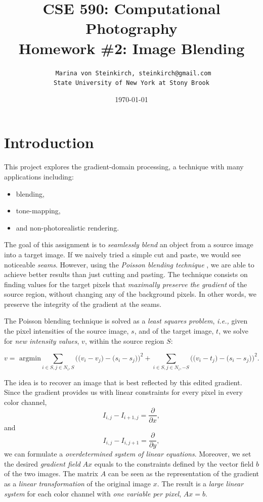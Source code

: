 \documentclass[11pt]{article}
\title{CSE 590: Computational Photography\\  Homework \#2: Image Blending }
\author{ \texttt{ Marina von Steinkirch, steinkirch@gmail.com}\\
	   \texttt{State University of New York at Stony Brook}}
\date{\today}
\newcommand{\ie}{{\it i.e., }}
\begin{document}
\maketitle
{}  




\section{Introduction}

This project explores the gradient-domain processing, a technique with many applications including:
\begin{itemize}
\item blending, 
\item tone-mapping, 
\item and non-photorealistic rendering.
\end{itemize}  

\quad

The  goal of this assignment is to {\it seamlessly blend} an object  from a source image into a target image. If we naively tried a simple cut and paste, we would see noticeable {\it seams}.  However, using the {\it Poisson blending technique} \cite{pois}, we are able  to achieve better results than just cutting and pasting.  The technique consists on finding values for the target pixels that {\it maximally preserve the gradient} of the source region, without changing any of the background pixels. In other words, we preserve the integrity of the gradient at the seams.

\quad 

The Poisson blending technique is solved as a {\it least squares problem}, \ie given the pixel intensities of the source image, $s$, and of the target image, $t$, we  solve for {\it new intensity values},  $v$, within the source region $S$:

\begin{equation}
v = \mbox{ argmin} \sum_{i \in S, j \in N_i, S} \Bigg ( \Big ( v_i -v_j\Big) - \Big (s_i - s_j \Big) \Bigg)^2 +  \sum_{i \in S, j \in N_i, -S} \Bigg ( \Big ( v_i -t_j\Big) - \Big (s_i - s_j \Big) \Bigg)^2. 
\label{aa}
\end{equation}

\quad

The idea is to recover an image that is best reflected by this edited gradient. Since the gradient provides us with linear constraints for every pixel in every color channel,
$$I_{i,j} - I_{i+1,j} = \frac{\partial}{\partial x},$$
and
$$I_{i,j} - I_{i,j+1} = \frac{\partial}{\partial y},$$
 we can formulate a {\it overdetermined system of linear equations}. Moreover, we set the desired {\it gradient field} $A x$ equals to the constraints defined by the vector field $b$ of the two images. The matrix $A$ can be seen as the representation of the gradient as a  {\it linear transformation} of the original image $x$. The result is a {\it large linear system} for each color channel with {\it one variable per pixel}, $Ax=b$. 
\end{document}
